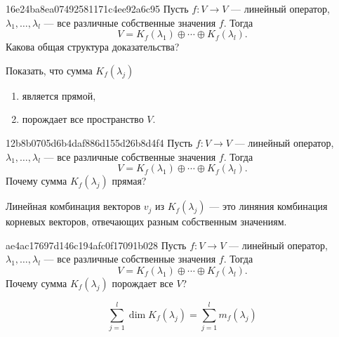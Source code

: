 \begin{note}{16e24ba8ea07492581171c4ee92a6c95}
    Пусть \( f : V \to V \) --- линейный оператор, \( \lambda_1, \ldots, \lambda_l \) --- все различные собственные значения \( f \).
    Тогда
    \[
        V = K_f (\lambda_1) \oplus \cdots \oplus K_f (\lambda_l).
    \]
    Какова общая структура доказательства?

    \begin{cloze}{1}
        Показать, что сумма \( K_f(\lambda_j) \)
        \begin{enumerate}
            \item является прямой,
            \item порождает все пространство \( V \).
        \end{enumerate}
    \end{cloze}
\end{note}

\begin{note}{12b8b0705d6b4daf886d155d26b8d4f4}
    Пусть \( f : V \to V \) --- линейный оператор, \( \lambda_1, \ldots, \lambda_l \) --- все различные собственные значения \( f \).
    Тогда
    \[
        V = K_f (\lambda_1) \oplus \cdots \oplus K_f (\lambda_l).
    \]
    Почему сумма \( K_f(\lambda_j) \) прямая?

    \begin{cloze}{1}
        Линейная комбинация векторов \( v_j \) из \( K_f (\lambda_j) \) --- это линяния комбинация корневых векторов, отвечающих разным собственным значениям.
    \end{cloze}
\end{note}

\begin{note}{ae4ac17697d146c194afc0f17091b028}
    Пусть \( f : V \to V \) --- линейный оператор, \( \lambda_1, \ldots, \lambda_l \) --- все различные собственные значения \( f \).
    Тогда
    \[
        V = K_f (\lambda_1) \oplus \cdots \oplus K_f (\lambda_l).
    \]
    Почему сумма \( K_f(\lambda_j) \) порождает все \( V \)?

    \begin{cloze}{1}
        \[
            \sum_{j=1}^{l} \dim K_f(\lambda_j) = \sum_{j=1}^{l} m_f(\lambda_j)
        \]
    \end{cloze}
\end{note}

